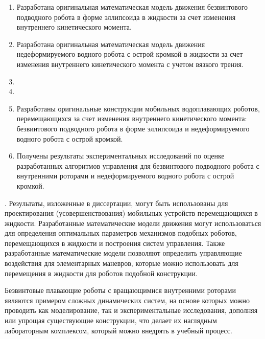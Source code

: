 {\novelty}
\begin{enumerate}
  \item Разработана оригинальная математическая модель движения безвинтового подводного робота в форме эллипсоида в жидкости за счет изменения внутреннего кинетического момента.
  \item Разработана оригинальная математическая модель движения недеформируемого водного робота с острой кромкой в жидкости за счет изменения внутреннего кинетического момента с учетом вязкого трения.
  \item {}
  \item {}
  \item Разработаны оригинальные конструкции мобильных водоплавающих роботов, перемещающихся за счет изменения внутреннего кинетического момента: безвинтового подводного робота в форме эллипсоида и недеформируемого водного робота с острой кромкой.
  \item Получены результаты экспериментальных исследований по оценке разработанных алгоритмов управления для безвинтового подводного робота с внутренними роторами и недеформируемого водного робота с острой кромкой.
\end{enumerate}

{\influence}. Результаты, изложенные в диссертации, могут быть использованы для проектирования (усовершенствования) мобильных устройств перемещающихся в жидкости. Разработанные математические модели движения могут использоваться для определения оптимальных параметров механизмов подобных роботов, перемещающихся в жидкости и построения систем управления. Также разработанные математические модели позволяют определить управляющие воздействия для элементарных маневров, которые можно использовать для перемещения в жидкости для роботов подобной конструкции.


Безвинтовые плавающие роботы с вращающимися внутренними роторами являются примером сложных динамических систем, на основе которых можно проводить как моделирование, так и экспериментальные исследования, дополняя или упрощая существующие конструкции, что делает их наглядным лабораторным комплексом, который можно внедрять в учебный процесс.


